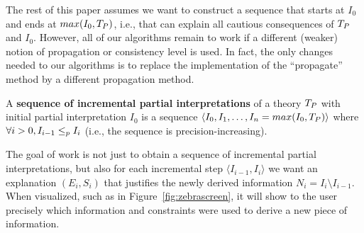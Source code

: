 The rest of this paper assumes we want to construct a sequence that starts at $I_0$ and ends at $max(I_0,T_P)$, i.e., that can explain all cautious consequences of $T_P$ and $I_0$. However, all of our algorithms remain to work if a different (weaker) notion of propagation or consistency level is used. In fact, the only changes needed to our algorithms is to replace the implementation of the ``propagate'' method by a different propagation method. 


% 




\begin{definition}
A \textbf{sequence of incremental partial interpretations} of a theory $T_P$ with initial partial interpretation $I_0$ is a sequence $\langle I_0, I_1, \ldots, I_n  = max(I_0,T_P)\rangle$ where $\forall i>0, I_{i-1} \leq_p I_{i}$ (i.e., the sequence is precision-increasing).
\end{definition} 

The goal of work is not just to obtain a sequence of incremental partial interpretations, but also 
% 
for each incremental step $\langle I_{i-1}, I_i \rangle$ we want an explanation $(E_i,S_i)$ that justifies the newly derived information $N_i = I_i \setminus I_{i-1}$. When visualized, such as in Figure~\ref{fig:zebrascreen}, it will show to the user precisely which information and constraints were used to derive a new piece of information.

